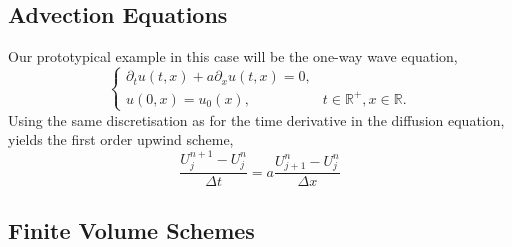 \documentclass[11pt, a4pape draft]{article}
\renewcommand{\R}{\mathbb{R}}
\newcommand{\Dt}{\Delta t}
\newcommand{\Dx}{\Delta x}
\begin{document}
        \subsection{Advection Equations}
        Our prototypical example in this case will be the one-way wave equation,
        \begin{equation}\begin{cases}
            \partial_t u(t,x) + a\partial_x u(t,x)=0,\\
            u(0,x) = u_0(x),  &t\in\R^+, x\in\R.
        \end{cases}\label{eq:wave}\end{equation}
        Using the same discretisation as for the time derivative in the diffusion equation, yields the first order upwind scheme,
        \[
            \frac{U^{n+1}_{j}-U^{n}_{j}}{\Dt} = a\frac{U^{n}_{j+1}-U^{n}_{j}}{\Dx}
        \]
        \subsection{Finite Volume Schemes}
        
		
\end{document}

